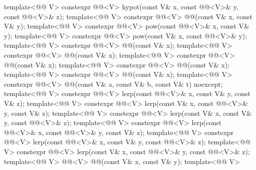 \begin{itemdecl}
template<@@ V>
  constexpr @@<V>
    hypot(const V& x, const @@<V>& y, const @@<V>& z);
template<@@ V>
  constexpr @@<V> @@(const V& x, const V& y);
template<@@ V>
  constexpr @@<V> pow(const @@<V>& x, const V& y);
template<@@ V>
  constexpr @@<V> pow(const V& x, const @@<V>& y);
template<@@ V> constexpr @@<V> @@(const V& x);
template<@@ V> constexpr @@<V> @@(const V& x);
template<@@ V> constexpr @@<V> @@(const V& x);
template<@@ V> constexpr @@<V> @@(const V& x);
template<@@ V> constexpr @@<V> @@(const V& x);
template<@@ V>
  constexpr @@<V> @@(const V& a, const V& b, const V& t) noexcept;
template<@@ V>
  constexpr @@<V> lerp(const @@<V>& x, const V& y, const V& z);
template<@@ V>
  constexpr @@<V> lerp(const V& x, const @@<V>& y, const V& z);
template<@@ V>
  constexpr @@<V> lerp(const V& x, const V& y, const @@<V>& z);
template<@@ V>
  constexpr @@<V>
    lerp(const @@<V>& x, const @@<V>& y, const V& z);
template<@@ V>
  constexpr @@<V>
    lerp(const @@<V>& x, const V& y, const @@<V>& z);
template<@@ V>
  constexpr @@<V>
    lerp(const V& x, const @@<V>& y, const @@<V>& z);
template<@@ V>
  @@<V> @@(const V& x, const V& y);
template<@@ V>

\end{itemdecl}
